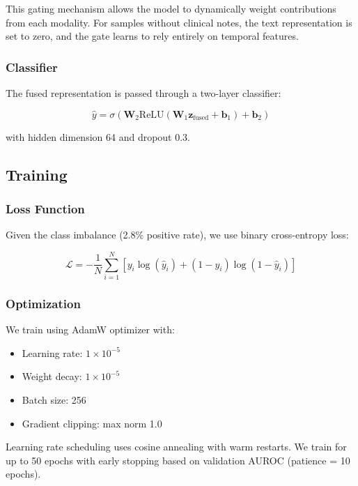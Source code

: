 This gating mechanism allows the model to dynamically weight contributions from each modality. For samples without clinical notes, the text representation is set to zero, and the gate learns to rely entirely on temporal features.

\subsubsection{Classifier}

The fused representation is passed through a two-layer classifier:

\begin{equation}
\hat{y} = \sigma(\mathbf{W}_2 \text{ReLU}(\mathbf{W}_1 \mathbf{z}_{\text{fused}} + \mathbf{b}_1) + \mathbf{b}_2)
\end{equation}

with hidden dimension 64 and dropout 0.3.

\subsection{Training}

\subsubsection{Loss Function}

Given the class imbalance (2.8\% positive rate), we use binary cross-entropy loss:

\begin{equation}
\mathcal{L} = -\frac{1}{N} \sum_{i=1}^{N} [y_i \log(\hat{y}_i) + (1-y_i) \log(1-\hat{y}_i)]
\end{equation}

\subsubsection{Optimization}

We train using AdamW optimizer with:
\begin{itemize}
    \item Learning rate: $1 \times 10^{-5}$
    \item Weight decay: $1 \times 10^{-5}$
    \item Batch size: 256
    \item Gradient clipping: max norm 1.0
\end{itemize}

Learning rate scheduling uses cosine annealing with warm restarts. We train for up to 50 epochs with early stopping based on validation AUROC (patience = 10 epochs).


